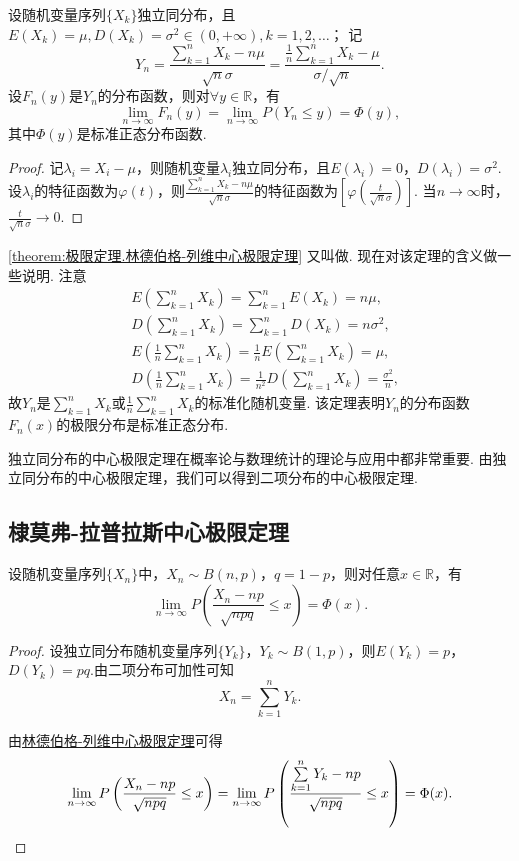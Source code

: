 \begin{theorem}\label{theorem:极限定理.林德伯格-列维中心极限定理}
设随机变量序列\(\{X_k\}\)独立同分布，且\(E(X_k)=\mu, D(X_k)=\sigma^2\in(0,+\infty), k=1,2,\dotsc\)；
记\[
Y_n = \frac{\sum\limits_{k=1}^n X_k - n\mu}{\sqrt{n} \sigma}
= \frac{ \frac{1}{n} \sum\limits_{k=1}^n X_k - \mu}{\sigma / \sqrt{n}}.
\]设\(F_n(y)\)是\(Y_n\)的分布函数，则对\(\forall y \in \mathbb{R}\)，有\[
\lim\limits_{n\to\infty} F_n(y)
= \lim\limits_{n\to\infty} P(Y_n \leq y) = \Phi(y),
\]其中\(\Phi(y)\)是标准正态分布函数.
\begin{proof}
记\(\lambda_i = X_i-\mu\)，则随机变量\(\lambda_i\)独立同分布，且\(E(\lambda_i)=0\)，\(D(\lambda_i)=\sigma^2\).
设\(\lambda_i\)的特征函数为\(\varphi(t)\)，则\(\frac{\sum\limits_{k=1}^n X_k - n\mu}{\sqrt{n} \sigma}\)的特征函数为\(\left[\varphi\left(\frac{t}{\sqrt{n}\sigma}\right)\right]\).
当\(n\to\infty\)时，\(\frac{t}{\sqrt{n}\sigma}\to0\).
\end{proof}
\end{theorem}

\cref{theorem:极限定理.林德伯格-列维中心极限定理} 又叫做.
现在对该定理的含义做一些说明.
注意\begin{align*}
&E\left(\sum\limits_{k=1}^n X_k\right) = \sum\limits_{k=1}^n E(X_k) = n\mu, \\
&D\left(\sum\limits_{k=1}^n X_k\right) = \sum\limits_{k=1}^n D(X_k) = n\sigma^2, \\
&E\left(\frac{1}{n} \sum\limits_{k=1}^n X_k\right)
= \frac{1}{n} E\left(\sum\limits_{k=1}^n X_k\right)
= \mu, \\
&D\left(\frac{1}{n} \sum\limits_{k=1}^n X_k\right)
= \frac{1}{n^2} D\left(\sum\limits_{k=1}^n X_k\right)
= \frac{\sigma^2}{n},
\end{align*}
故\(Y_n\)是\(\sum\limits_{k=1}^n X_k\)或\(\frac{1}{n} \sum\limits_{k=1}^n X_k\)的标准化随机变量.
该定理表明\(Y_n\)的分布函数\(F_n(x)\)的极限分布是标准正态分布.

独立同分布的中心极限定理在概率论与数理统计的理论与应用中都非常重要.
由独立同分布的中心极限定理，我们可以得到二项分布的中心极限定理.
\subsection{棣莫弗-拉普拉斯中心极限定理}
\begin{theorem}\label{theorem:极限定理.棣莫弗-拉普拉斯中心极限定理}
设随机变量序列\(\{X_n\}\)中，\(X_n \sim B(n,p)\)，\(q = 1-p\)，则对任意\(x \in \mathbb{R}\)，有\[
\lim\limits_{n\to\infty} P\left( \frac{X_n - np}{\sqrt{npq}} \leq x \right) = \Phi(x).
\]
\begin{proof}
设独立同分布随机变量序列\(\{Y_k\}\)，\(Y_k \sim B(1,p)\)，则\(E(Y_k)=p\)，\(D(Y_k)=pq\).由二项分布可加性可知\[
X_n = \sum\limits_{k=1}^n{Y_k}.
\]

由\hyperref[theorem:极限定理.林德伯格-列维中心极限定理]{林德伯格-列维中心极限定理}可得\[
\lim\limits_{n\to\infty} P\left(\frac{X_n-np}{\sqrt{npq}} \leq x\right)
= \lim\limits_{n\to\infty} P\left(\frac{\sum\limits_{k=1}^n{Y_k}-np}{\sqrt{npq}} \leq x\right)
= \Phi(x).
\qedhere
\]
\end{proof}
\end{theorem}

